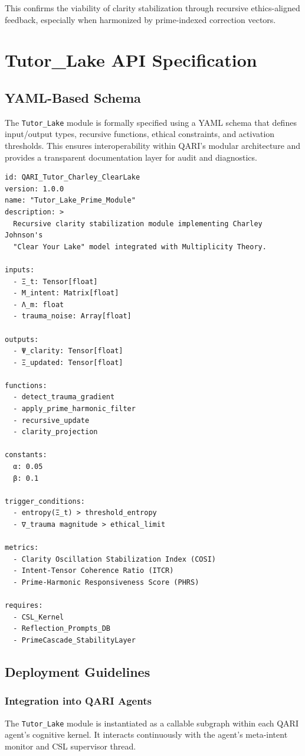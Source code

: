 \documentclass[12pt]{article}
\begin{document}
This confirms the viability of clarity stabilization through recursive ethics-aligned feedback, especially when harmonized by prime-indexed correction vectors.

\section{Tutor\_Lake API Specification}

\subsection{YAML-Based Schema}

The \texttt{Tutor\_Lake} module is formally specified using a YAML schema that defines input/output types, recursive functions, ethical constraints, and activation thresholds. This ensures interoperability within QARI's modular architecture and provides a transparent documentation layer for audit and diagnostics.

\begin{verbatim}
id: QARI_Tutor_Charley_ClearLake
version: 1.0.0
name: "Tutor_Lake_Prime_Module"
description: >
  Recursive clarity stabilization module implementing Charley Johnson's
  "Clear Your Lake" model integrated with Multiplicity Theory.

inputs:
  - Ξ_t: Tensor[float]
  - M_intent: Matrix[float]
  - Λ_m: float
  - trauma_noise: Array[float]

outputs:
  - Ψ_clarity: Tensor[float]
  - Ξ_updated: Tensor[float]

functions:
  - detect_trauma_gradient
  - apply_prime_harmonic_filter
  - recursive_update
  - clarity_projection

constants:
  α: 0.05
  β: 0.1

trigger_conditions:
  - entropy(Ξ_t) > threshold_entropy
  - ∇_trauma magnitude > ethical_limit

metrics:
  - Clarity Oscillation Stabilization Index (COSI)
  - Intent-Tensor Coherence Ratio (ITCR)
  - Prime-Harmonic Responsiveness Score (PHRS)

requires:
  - CSL_Kernel
  - Reflection_Prompts_DB
  - PrimeCascade_StabilityLayer
\end{verbatim}

\subsection{Deployment Guidelines}

\subsubsection*{Integration into QARI Agents}
The \texttt{Tutor\_Lake} module is instantiated as a callable subgraph within each QARI agent’s cognitive kernel. It interacts continuously with the agent’s meta-intent monitor and CSL supervisor thread.
\end{document}
